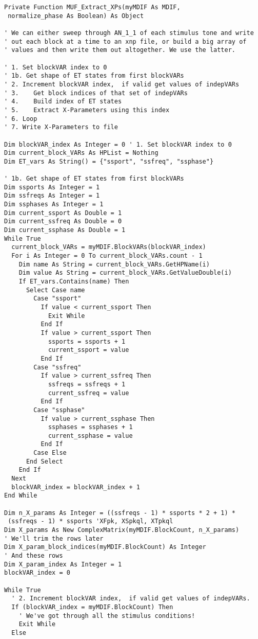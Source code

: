 \documentclass[../thesis/thesis.tex]{subfiles}
\begin{document}
\begin{lstlisting}[language=vbscript]
Private Function MUF_Extract_XPs(myMDIF As MDIF, 
 normalize_phase As Boolean) As Object

' We can either sweep through AN_1_1 of each stimulus tone and write 
' out each block at a time to an xnp file, or build a big array of  
' values and then write them out altogether. We use the latter.

' 1. Set blockVAR index to 0
' 1b. Get shape of ET states from first blockVARs
' 2. Increment blockVAR index,  if valid get values of indepVARs
' 3.    Get block indices of that set of indepVARs
' 4.    Build index of ET states
' 5.    Extract X-Parameters using this index
' 6. Loop
' 7. Write X-Parameters to file

Dim blockVAR_index As Integer = 0 ' 1. Set blockVAR index to 0
Dim current_block_VARs As HPList = Nothing
Dim ET_vars As String() = {"ssport", "ssfreq", "ssphase"}

' 1b. Get shape of ET states from first blockVARs
Dim ssports As Integer = 1
Dim ssfreqs As Integer = 1
Dim ssphases As Integer = 1
Dim current_ssport As Double = 1
Dim current_ssfreq As Double = 0
Dim current_ssphase As Double = 1
While True
  current_block_VARs = myMDIF.BlockVARs(blockVAR_index)
  For i As Integer = 0 To current_block_VARs.count - 1
    Dim name As String = current_block_VARs.GetHPName(i)
    Dim value As String = current_block_VARs.GetValueDouble(i)
    If ET_vars.Contains(name) Then
      Select Case name
        Case "ssport"
          If value < current_ssport Then
            Exit While
          End If
          If value > current_ssport Then
            ssports = ssports + 1
            current_ssport = value
          End If
        Case "ssfreq"
          If value > current_ssfreq Then
            ssfreqs = ssfreqs + 1
            current_ssfreq = value
          End If
        Case "ssphase"
          If value > current_ssphase Then
            ssphases = ssphases + 1
            current_ssphase = value
          End If
        Case Else
      End Select
    End If
  Next
  blockVAR_index = blockVAR_index + 1
End While

Dim n_X_params As Integer = ((ssfreqs - 1) * ssports * 2 + 1) * 
 (ssfreqs - 1) * ssports 'XFpk, XSpkql, XTpkql
Dim X_params As New ComplexMatrix(myMDIF.BlockCount, n_X_params) 
' We'll trim the rows later
Dim X_param_block_indices(myMDIF.BlockCount) As Integer 
' And these rows
Dim X_param_index As Integer = 1
blockVAR_index = 0

While True
  ' 2. Increment blockVAR index,  if valid get values of indepVARs.
  If (blockVAR_index = myMDIF.BlockCount) Then
    ' We've got through all the stimulus conditions!
    Exit While
  Else
  

\end{lstlisting}
\end{document}
